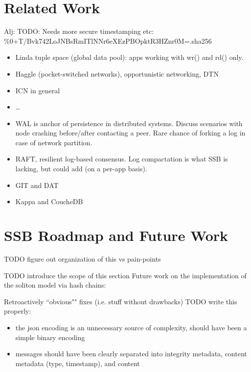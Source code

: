 \documentclass[sigconf]{acmart}
\begin{document}
\section{Related Work}

Alj: TODO: Needs more secure timestamping etc: \%0+T/Bvk742LoJNBsRmITlNNr6eXEzPBOpktR3HZnr0M=.sha256

\begin{itemize}
\item Linda tuple space (global data pool): apps working with wr() and rd() only.
\item Haggle (pocket-switched networks), opportunistic networking, DTN
\item ICN in general
\item \ldots
\item WAL is anchor of persistence in distributed systems. Discuss scenarios with node crashing before/after contacting a peer. Rare chance of forking a log in case of network partition.
\item RAFT, resilient log-based consensus. Log compactation is what SSB is lacking, but could add (on a per-app basis).
\item GIT and DAT
\item Kappa and CoucheDB
\end{itemize}

\section{SSB Roadmap and Future Work}

TODO figure out organization of this vs pain-points

TODO introduce the scope of this section
Future work on the implementation of the soliton model via hash chains:

Retroactively ``obvious"" fixes (i.e. stuff without drawbacks) TODO write this properly:

\begin{itemize}

\item the json encoding is an unnecessary source of complexity, should have been a simple binary encoding

\item messages should have been clearly separated into integrity metadata, content metadata (type, timestamp), and content

\end{itemize}
\end{document}
